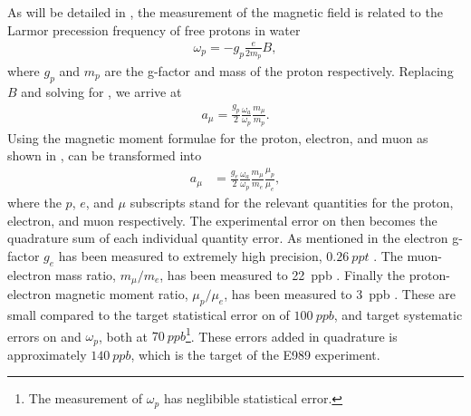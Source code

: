 As will be detailed in , the measurement of the magnetic field is related to the Larmor precession frequency of free protons in water 
        \begin{align} \label{eq:wp}
            \omega_{p} = -g_{p} \frac{e}{2m_{p}} B,
        \end{align}
where $g_{p}$ and $m_{p}$ are the g-factor and mass of the proton respectively. Replacing $B$ and solving for \amu, we arrive at 
        \begin{align} \label{eq:amu}
            a_{\mu} = \frac{g_{p}}{2} \frac{\omega_{a}}{\omega_{p}} \frac{m_{\mu}}{m_{p}}.
        \end{align}
Using the magnetic moment formulae for the proton, electron, and muon as shown in ,  can be transformed into
        \begin{align} 
            a_{\mu} &= \frac{g_{e}}{2} \frac{\omega_{a}}{\omega_{p}} \frac{m_{\mu}}{m_{e}} \frac{\mu_{p}}{\mu_{e}}, \label{eq:amuratios}
        \end{align}
where the $p$, $e$, and $\mu$ subscripts stand for the relevant quantities for the proton, electron, and muon respectively. The experimental error on \amu then becomes the quadrature sum of each individual quantity error. As mentioned in  the electron g-factor $g_{e}$ has been measured to extremely high precision, $\SI{0.26}{ppt}$ \cite{CODATA,ElectronMDM}. The muon-electron mass ratio, $m_{\mu}/m_{e}$, has been measured to \SI{22}{ppb} \cite{CODATA,MuoniumHyperfine}. Finally the proton-electron magnetic moment ratio, $\mu_{p}/\mu_{e}$, has been measured to \SI{3}{ppb} \cite{CODATA}. These are small compared to the target statistical error on \wa of $\SI{100}{ppb}$, and target systematic errors on \wa and $\omega_{p}$, both at $\SI{70}{ppb}$\footnote{The measurement of $\omega_{p}$ has neglibible statistical error.}. These errors added in quadrature is approximately $\SI{140}{ppb}$, which is the target of the E989 experiment.



